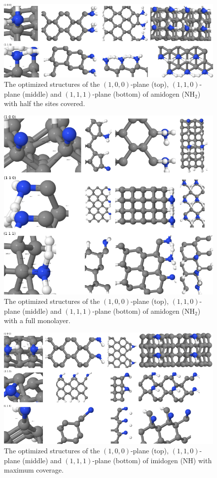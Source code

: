 \documentclass[10pt,a4paper]{article}
\begin{document}
\begin{figure} \captionsetup{width=.8\linewidth} \caption{The optimized structures of the $(1,  0,  0)$-plane (top), $(1,  1,  0)$-plane (middle) and $(1,  1, 1)$-plane (bottom) of amidogen (NH$_2$) with  half the sites covered.} \label{NH2_summary_covered}
\includegraphics[width=.8\linewidth]{pictures/NH2_summary_covered.png}
\end{figure}


\begin{figure} \captionsetup{width=.8\linewidth} \caption{The optimized structures of the $(1,  0,  0)$-plane (top), $(1,  1,  0)$-plane (middle) and $(1,  1, 1)$-plane (bottom) of amidogen (NH$_2$) with a full monolayer.} \label{NH2_summary_half}
\includegraphics[width=.8\linewidth]{pictures/NH2_summary_half.png}
\end{figure}


\begin{figure} \captionsetup{width=.8\linewidth} \caption{The optimized structures of the $(1,  0,  0)$-plane (top), $(1,  1,  0)$-plane (middle) and $(1,  1, 1)$-plane (bottom) of imidogen (NH) with maximum coverage.} \label{NHbridge_summary}
%
\includegraphics[width=.8\linewidth]{pictures/NHbridge_summary.png}
\end{figure}
\end{document}

